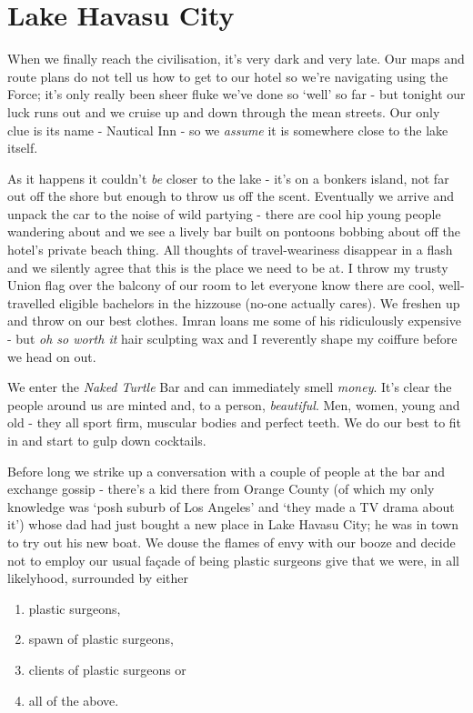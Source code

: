 \documentclass[a5paper,10pt,titlepage,draft]{book}
\begin{document}
\section*{Lake Havasu City}
When we finally reach the civilisation, it's very dark and very late.  Our maps and route plans do not tell us how to get to our hotel so we're navigating using the Force; it's only really been sheer fluke we've done so `well' so far - but tonight our luck runs out and we cruise up and down through the mean streets.  Our only clue is its name - Nautical Inn - so we \emph{assume} it is somewhere close to the lake itself.

As it happens it couldn't \emph{be} closer to the lake - it's on a bonkers island, not far out off the shore but enough to throw us off the scent.  Eventually we arrive and unpack the car to the noise of wild partying - there are cool hip young people wandering about and we see a lively bar built on pontoons bobbing about off the hotel's private beach thing.  All thoughts of travel-weariness disappear in a flash and we silently agree that this is the place we need to be at.  I throw my trusty Union flag over the balcony of our room to let everyone know there are cool, well-travelled eligible bachelors in the hizzouse (no-one actually cares).  We freshen up and throw on our best clothes.  Imran loans me some of his ridiculously expensive - but \emph{oh so worth it} hair sculpting wax and I reverently shape my coiffure before we head on out.

We enter the \emph{Naked Turtle} Bar and can immediately smell \emph{money}.  It's clear the people around us are minted and, to a person, \emph{beautiful}.  Men, women, young and old - they all sport firm, muscular bodies and perfect teeth.  We do our best to fit in and start to gulp down cocktails.

Before long we strike up a conversation with a couple of people at the bar and exchange gossip - there's a kid there from Orange County (of which my only knowledge was `posh suburb of Los Angeles' and `they made a TV drama about it') whose dad had just bought a new place in Lake Havasu City; he was in town to try out his new boat.  We douse the flames of envy with our booze and decide not to employ our usual fa\c{c}ade of being plastic surgeons give that we were, in all likelyhood, surrounded by either
\begin{enumerate}
\item plastic surgeons,
\item spawn of plastic surgeons,
\item clients of plastic surgeons or
\item all of the above.
\end{enumerate}
\end{document}
